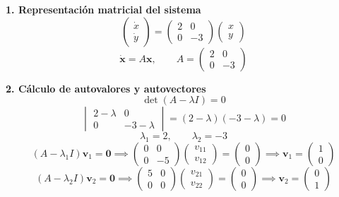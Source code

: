 \documentclass[11pt,a4paper]{article}
\newenvironment{solucion}[1][Solución Detallada]{%
    \vspace{1.5mm}%
    \noindent{\large\textbf{Solución:}}\par\vspace{1.5mm}%
}{%
    \par\vspace{3mm}%
}
\begin{document}
\begin{solucion}

\textbf{\large 1. Representación matricial del sistema}
\[
\begin{pmatrix} \dot{x} \\ \dot{y} \end{pmatrix} = \begin{pmatrix} 2 & 0 \\ 0 & -3 \end{pmatrix} \begin{pmatrix} x \\ y \end{pmatrix}
\]
\[
\boxed{\dot{\mathbf{x}} = A \mathbf{x}, \qquad A = \begin{pmatrix} 2 & 0 \\ 0 & -3 \end{pmatrix}}
\]

\vspace{3.5mm}

\textbf{\large 2. Cálculo de autovalores y autovectores}
\[
\det(A - \lambda I) = 0
\]
\[
\begin{vmatrix} 2 - \lambda & 0 \\ 0 & -3 - \lambda \end{vmatrix} = (2 - \lambda)(-3 - \lambda) = 0
\]
\[
\boxed{\lambda_1 = 2, \qquad \lambda_2 = -3}
\]
\[
(A - \lambda_1 I)\mathbf{v}_1 = \mathbf{0} \implies \begin{pmatrix} 0 & 0 \\ 0 & -5 \end{pmatrix} \begin{pmatrix} v_{11} \\ v_{12} \end{pmatrix} = \begin{pmatrix} 0 \\ 0 \end{pmatrix} \implies \boxed{\mathbf{v}_1 = \begin{pmatrix} 1 \\ 0 \end{pmatrix}}
\]
\[
(A - \lambda_2 I)\mathbf{v}_2 = \mathbf{0} \implies \begin{pmatrix} 5 & 0 \\ 0 & 0 \end{pmatrix} \begin{pmatrix} v_{21} \\ v_{22} \end{pmatrix} = \begin{pmatrix} 0 \\ 0 \end{pmatrix} \implies \boxed{\mathbf{v}_2 = \begin{pmatrix} 0 \\ 1 \end{pmatrix}}
\]


\end{solucion}
\end{document}
